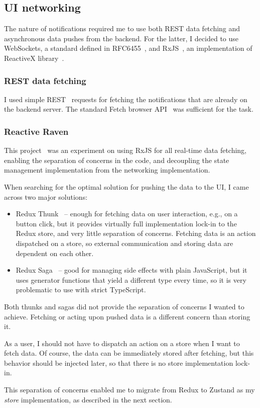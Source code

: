 \subsection{UI networking}\label{ui-networking}

The nature of notifications required me to use
both REST data fetching and asynchronous data pushes from the backend.
For the latter, I decided to use WebSockets,
a standard defined in RFC6455~\cite{fette_rfc6455_2011}, and
RxJS~\cite{lesh_rxjs_2022}, an implementation of
ReactiveX library~\cite{gross_reactivex_2021}.

\subsubsection{REST data fetching}\label{rest-data-fetching}

I used simple REST~\cite{perrier_rest_2022} requests
for fetching the notifications
that are already on the backend server.
The standard Fetch browser API~\cite{perrier_fetch_2022}
was sufficient for the task.

\subsubsection{Reactive Raven}\label{reactive-raven}

This project~\cite{sewera_reactive_2022} was an experiment
on using RxJS for all real-time data fetching,
enabling the separation of concerns in the code,
and decoupling the state management implementation
from the networking implementation.

When searching for the optimal solution for pushing the data to the UI,
I came across two major solutions:

\begin{itemize}
  \item
        Redux Thunk~\cite{gaeraon_redux_2022-1} --
        enough for fetching data on user interaction,
        e.g., on a button click,
        but it provides virtually full implementation lock-in
        to the Redux store, and very little separation of concerns.
        Fetching data is an action dispatched on a store,
        so external communication and storing data are dependent on each other.
  \item
        Redux Saga~\cite{elouafi_redux_2022} --
        good for managing side effects with plain JavaScript,
        but it uses generator functions
        that yield a different type every time,
        so it is very problematic to use with strict TypeScript.
\end{itemize}

Both thunks and sagas did not provide the separation of concerns
I wanted to achieve.
Fetching or acting upon pushed data
is a different concern than storing it.

As a user,
I should not have to dispatch an action on a store
when I want to fetch data.
Of course, the data can be immediately stored after fetching,
but this behavior should be injected later,
so that there is no store implementation lock-in.

This separation of concerns enabled me to
migrate from Redux to Zustand as my \emph{store} implementation,
as described in the next section.
